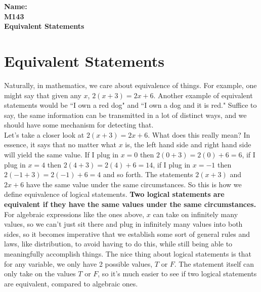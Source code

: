 \documentclass[10pt]{article}
\theoremstyle{definition}
\begin{document}
%

{\bf Name:} \hrulefill\hrulefill\hrulefill\\
{\bf M143} \qquad \qquad \\
{\bf Equivalent Statements}\\ %



\section{Equivalent Statements}


Naturally, in mathematics, we care about equivalence of things.  For example, one might say that given any $x$, $2(x+3)=2x+6$.  Another example of equivalent statements would be ``I own a red dog" and ``I own a dog and it is red."  Suffice to say, the same information can be transmitted in a lot of distinct ways, and we should have some mechanism for detecting that.\\

Let's take a closer look at $2(x+3)=2x+6$.  What does this really mean?  In essence, it says that no matter what $x$ is, the left hand side and right hand side will yield the same value.  If I plug in $x=0$ then $2(0+3)=2(0)+6=6$, if I plug in $x=4$ then $2(4+3)=2(4)+6=14$, if I plug in $x=-1$ then $2(-1+3)=2(-1)+6=4$ and so forth.  The statements $2(x+3)$ and $2x+6$ have the same value under the same circumstances.  So this is how we define equivalence of logical statements. {\bf Two logical statements are equivalent if they have the same values under the same circumstances.}\\

For algebraic expressions like the ones above, $x$ can take on infinitely many values, so we can't just sit there and plug in infinitely many values into both sides, so it becomes imperative that we establish some sort of general rules and laws, like distribution, to avoid having to do this, while still being able to meaningfully accomplish things.  The nice thing about logical statements is that for any variable, we only have 2 possible values, $T$ or $F$.  The statement itself can only take on the values $T$ or $F$, so it's much easier to see if two logical statements are equivalent, compared to algebraic ones.\\
\end{document}

